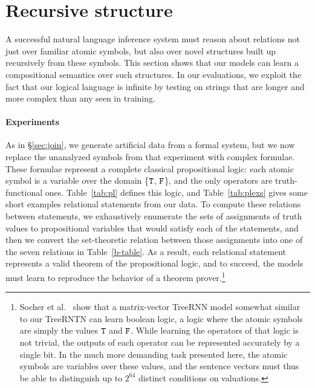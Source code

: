 \section{Recursive structure}\label{sec:recursion}

A successful natural language inference system must reason 
about relations not just over familiar
atomic symbols, but also over novel structures built up 
recursively from these symbols. 
This section shows that our models can learn a 
compositional semantics over such structures.
In our evaluations, we exploit the fact that our logical language
is infinite by testing on strings that are longer and more complex
than any seen in training.














\paragraph{Experiments}
As in \S\ref{sec:join}, we generate artificial data from a formal system,
 but we now replace the unanalyzed symbols
from that experiment with complex formulae. These formulae
represent a complete classical propositional logic:
each atomic symbol is a variable over the domain \{$\texttt{T}$, $\texttt{F}$\}, and the only
operators are truth-functional ones.  Table~\ref{tab:pl} defines this
logic, and Table~\ref{tab:plexs} gives some short examples relational statements from our data.
 To compute these relations
between statements, we exhaustively enumerate the sets of assignments
of truth values to propositional variables that would satisfy each of
the statements, and then we convert the set-theoretic relation between
those assignments into one of the seven relations in
Table~\ref{b-table}. As a result, each relational statement represents
a valid theorem of the propositional logic, and to succeed, the models 
must learn to reproduce the behavior of a theorem prover.\footnote{
Socher et al.~ show that a matrix-vector TreeRNN
model somewhat similar to our TreeRNTN can learn boolean logic, 
a logic where the atomic symbols are simply the
values $\texttt{T}$ and $\texttt{F}$. While learning the operators of that logic is not trivial, the outputs of
each operator can be represented accurately by a single bit.
In the much more demanding task presented here, the atomic symbols are variables over these values, and the sentence vectors must thus be able to distinguish up to $2^{64}$ distinct conditions on valuations.}

